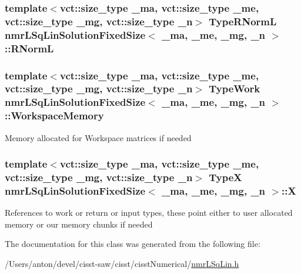 \subsubsection[{R\+Norm\+L}]{\setlength{\rightskip}{0pt plus 5cm}template$<$vct\+::size\+\_\+type \+\_\+ma, vct\+::size\+\_\+type \+\_\+me, vct\+::size\+\_\+type \+\_\+mg, vct\+::size\+\_\+type \+\_\+n$>$ {\bf Type\+R\+Norm\+L} {\bf nmr\+L\+Sq\+Lin\+Solution\+Fixed\+Size}$<$ \+\_\+ma, \+\_\+me, \+\_\+mg, \+\_\+n $>$\+::R\+Norm\+L\hspace{0.3cm}{\ttfamily [protected]}}\label{classnmr_l_sq_lin_solution_fixed_size_ae7fc2b92147410b773caab779fefcb66}
\hypertarget{classnmr_l_sq_lin_solution_fixed_size_a3718294e665cb353e17c58bae35e91ef}{}
\subsubsection[{Workspace\+Memory}]{\setlength{\rightskip}{0pt plus 5cm}template$<$vct\+::size\+\_\+type \+\_\+ma, vct\+::size\+\_\+type \+\_\+me, vct\+::size\+\_\+type \+\_\+mg, vct\+::size\+\_\+type \+\_\+n$>$ {\bf Type\+Work} {\bf nmr\+L\+Sq\+Lin\+Solution\+Fixed\+Size}$<$ \+\_\+ma, \+\_\+me, \+\_\+mg, \+\_\+n $>$\+::Workspace\+Memory\hspace{0.3cm}{\ttfamily [protected]}}\label{classnmr_l_sq_lin_solution_fixed_size_a3718294e665cb353e17c58bae35e91ef}
Memory allocated for Workspace matrices if needed \hypertarget{classnmr_l_sq_lin_solution_fixed_size_ae6be321dc3efeb73c08a9b66ca650c59}{}
\subsubsection[{X}]{\setlength{\rightskip}{0pt plus 5cm}template$<$vct\+::size\+\_\+type \+\_\+ma, vct\+::size\+\_\+type \+\_\+me, vct\+::size\+\_\+type \+\_\+mg, vct\+::size\+\_\+type \+\_\+n$>$ {\bf Type\+X} {\bf nmr\+L\+Sq\+Lin\+Solution\+Fixed\+Size}$<$ \+\_\+ma, \+\_\+me, \+\_\+mg, \+\_\+n $>$\+::X\hspace{0.3cm}{\ttfamily [protected]}}\label{classnmr_l_sq_lin_solution_fixed_size_ae6be321dc3efeb73c08a9b66ca650c59}
References to work or return or input types, these point either to user allocated memory or our memory chunks if needed 

The documentation for this class was generated from the following file\+:\begin{DoxyCompactItemize}
\item 
/\+Users/anton/devel/cisst-\/saw/cisst/cisst\+Numerical/\hyperlink{nmr_l_sq_lin_8h}{nmr\+L\+Sq\+Lin.\+h}\end{DoxyCompactItemize}
